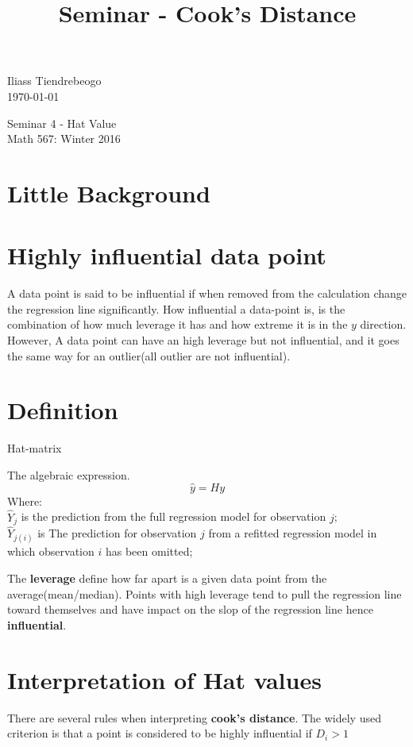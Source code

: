 \documentclass{article}[16pt]
\begin{document}
\begin{center}


\title{Seminar - Cook's Distance }
\hfill Iliass Tiendrebeogo\\

\hfill \today\\
\end{center}
\bigskip

\begin{center}
  \begin{Large}
      
    Seminar 4 - Hat Value \\
    Math 567: Winter 2016 \\
       
  \end{Large}
\end{center}

\bigskip
\section{Little Background}
\section{Highly influential  data point}
A data point is said to be influential if when removed from the calculation change the regression line significantly. How influential a data-point is, is the combination of how much leverage it has and how extreme it is in the $y$ direction. However, A data point can have an high leverage but not influential, and it goes the same way for an outlier(all outlier are not influential).
\section{Definition}
Hat-matrix  

\bigskip
The algebraic expression.
$$\hat{y} = Hy$$
Where:\\
$\hat{Y}_j$ is the prediction from the full regression model for observation $j$; \\
$\hat{Y}_{j(i)}$ is The prediction for observation $j$ from a refitted regression model in which observation $i$ has been omitted;


The {\bf leverage} define how far apart is a given data point from the average(mean/median). Points with high leverage tend to pull the regression line toward themselves and have impact on the slop of the regression line hence {\bf influential}.

\section{Interpretation of Hat values}
There are several rules when interpreting {\bf cook's distance}. The widely used criterion is that a point is considered to be highly influential if $D_i > 1$ \citep{weisberg}
\end{document}
